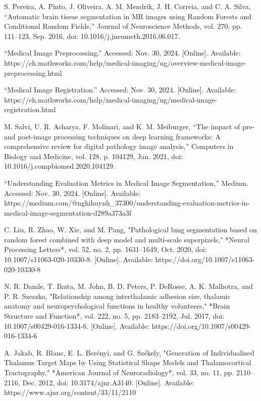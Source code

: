 \begin{thebibliography}{00}
	 S. Pereira, A. Pinto, J. Oliveira, A. M. Mendrik, J. H. Correia, and C. A. Silva, “Automatic brain tissue segmentation in MR images using Random Forests and Conditional Random Fields,” Journal of Neuroscience Methods, vol. 270, pp. 111–123, Sep. 2016, doi: 10.1016/j.jneumeth.2016.06.017.
	
	 “Medical Image Preprocessing.” Accessed: Nov. 30, 2024. [Online]. Available: https://ch.mathworks.com/help/medical-imaging/ug/overview-medical-image-preprocessing.html
	
	 “Medical Image Registration.” Accessed: Nov. 30, 2024. [Online]. Available: https://ch.mathworks.com/help/medical-imaging/ug/medical-image-registration.html
	
	 M. Salvi, U. R. Acharya, F. Molinari, and K. M. Meiburger, “The impact of pre- and post-image processing techniques on deep learning frameworks: A comprehensive review for digital pathology image analysis,” Computers in Biology and Medicine, vol. 128, p. 104129, Jan. 2021, doi: 10.1016/j.compbiomed.2020.104129.
	
	 “Understanding Evaluation Metrics in Medical Image Segmentation,” Medium. Accessed: Nov. 30, 2024. [Online]. Available: https://medium.com/@nghihuynh\_37300/understanding-evaluation-metrics-in-medical-image-segmentation-d289a373a3f
	
	C. Liu, R. Zhao, W. Xie, and M. Pang, "Pathological lung segmentation based on random forest combined with deep model and multi-scale superpixels," *Neural Processing Letters*, vol. 52, no. 2, pp. 1631–1649, Oct. 2020, doi: 10.1007/s11063-020-10330-8. [Online]. Available: https://doi.org/10.1007/s11063-020-10330-8
	
	N. R. Damle, T. Ikuta, M. John, B. D. Peters, P. DeRosse, A. K. Malhotra, and P. R. Szeszko, "Relationship among interthalamic adhesion size, thalamic anatomy and neuropsychological functions in healthy volunteers," *Brain Structure and Function*, vol. 222, no. 5, pp. 2183–2192, Jul. 2017, doi: 10.1007/s00429-016-1334-6. [Online]. Available: https://doi.org/10.1007/s00429-016-1334-6
	
	A. Jakab, R. Blanc, E. L. Berényi, and G. Székely, "Generation of Individualized Thalamus Target Maps by Using Statistical Shape Models and Thalamocortical Tractography," *American Journal of Neuroradiology*, vol. 33, no. 11, pp. 2110–2116, Dec. 2012, doi: 10.3174/ajnr.A3140. [Online]. Available: https://www.ajnr.org/content/33/11/2110
	

\end{thebibliography}
